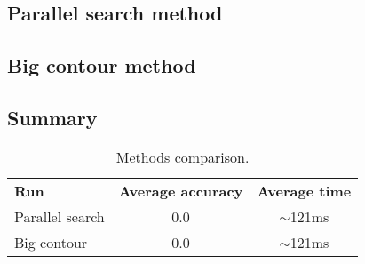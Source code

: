 

\subsection{Parallel search method}

\subsection{Big contour method}

\subsection{Summary}

\begin{table}[ht]
\centering
\caption{Methods comparison.}
\label{chessboard:table:methods}
\begin{tabular}{lcc}
\textbf{Run} & \textbf{Average accuracy} & \textbf{Average time} \\
Parallel search & 0.0 & $\sim$121ms \\
Big contour & 0.0 & $\sim$121ms
\end{tabular}
\end{table}